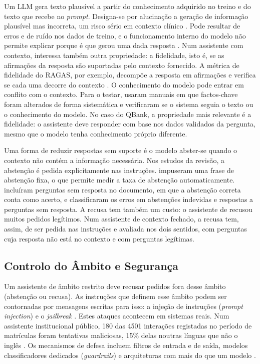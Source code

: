 Um \gls{LLM} gera texto plausível a partir do conhecimento adquirido no treino e do texto que recebe no \emph{prompt}. Designa-se por alucinação a geração de informação plausível mas incorreta, um risco sério em contexto clínico \parencite{hu2025advancing}. Pode resultar de erros e de ruído nos dados de treino, e o funcionamento interno do modelo não permite explicar porque é que gerou uma dada resposta \parencite{wu2023brief}. Num assistente com contexto, interessa também outra propriedade: a fidelidade, isto é, se as afirmações da resposta são suportadas pelo contexto fornecido. A métrica de fidelidade do \gls{RAGAS}, por exemplo, decompõe a resposta em afirmações e verifica se cada uma decorre do contexto \parencite{nurfadhilah2025retrieval}. O conhecimento do modelo pode entrar em conflito com o contexto. Para o testar, \textcite{jain2025aligning} usaram manuais em que factos-chave foram alterados de forma sistemática e verificaram se o sistema seguia o texto ou o conhecimento do modelo. No caso do QBank, a propriedade mais relevante é a fidelidade: o assistente deve responder com base nos dados validados da pergunta, mesmo que o modelo tenha conhecimento próprio diferente.

Uma forma de reduzir respostas sem suporte é o modelo abster-se quando o contexto não contém a informação necessária. Nos estudos da revisão, a abstenção é pedida explicitamente nas instruções. \textcite{ishadya2026mitigating} impuseram uma frase de abstenção fixa, o que permite medir a taxa de abstenção automaticamente. \textcite{hamidi2026large} incluíram perguntas sem resposta no documento, em que a abstenção correta conta como acerto, e classificaram os erros em abstenções indevidas e respostas a perguntas sem resposta. A recusa tem também um custo: o assistente de \textcite{abrar2025domain} recusou muitos pedidos legítimos. Num assistente de contexto fechado, a recusa tem, assim, de ser pedida nas instruções e avaliada nos dois sentidos, com perguntas cuja resposta não está no contexto e com perguntas legítimas.

\subsection{Controlo do Âmbito e Segurança}
\label{sec:chap2_security}

Um assistente de âmbito restrito deve recusar pedidos fora desse âmbito (abstenção ou recusa). As instruções que definem esse âmbito podem ser contornadas por mensagens escritas para isso: a injeção de instruções (\emph{prompt injection}) e o \emph{jailbreak} \parencite{kavitha2026securecontext,tien2024optimizing}. Estes ataques acontecem em sistemas reais. Num assistente institucional público, 180 das 4501 interações registadas no período de matrículas foram tentativas maliciosas, 15\% delas noutras línguas que não o inglês \parencite{emekci2025securing}. Os mecanismos de defesa incluem filtros de entrada e de saída, modelos classificadores dedicados (\emph{guardrails}) e arquiteturas com mais do que um modelo \parencite{kavitha2026securecontext,emekci2025securing,walczak2026comparative}.


